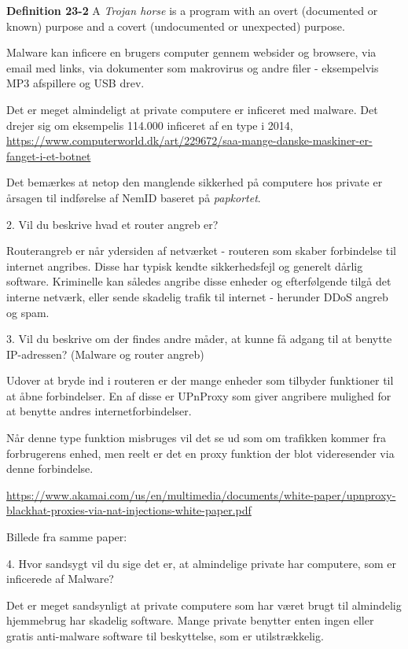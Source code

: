 \documentclass[a4paper,11pt,notitlepage]{report}
\begin{document}
{\bf Definition 23-2} A \emph{Trojan horse} is a program with an overt (documented or\\
known) purpose and a covert (undocumented or unexpected) purpose.

Malware kan inficere en brugers computer gennem websider og browsere, via email med links, via dokumenter som makrovirus og andre filer - eksempelvis MP3 afspillere og USB drev.

Det er meget almindeligt at private computere er inficeret med malware. Det drejer sig om eksempelis 114.000 inficeret af en type i 2014,\\ {\footnotesize\url{https://www.computerworld.dk/art/229672/saa-mange-danske-maskiner-er-fanget-i-et-botnet}}

Det bemærkes at netop den manglende sikkerhed på computere hos private er årsagen til indførelse af NemID baseret på \emph{papkortet}.

2.  Vil du beskrive hvad et router angreb er?

Routerangreb er når ydersiden af netværket - routeren som skaber forbindelse til internet angribes. Disse har typisk kendte sikkerhedsfejl og generelt dårlig software. Kriminelle kan således angribe disse enheder og efterfølgende tilgå det interne netværk, eller sende skadelig trafik til internet - herunder DDoS angreb og spam.


3.  Vil du beskrive om der findes andre måder, at kunne få adgang til at benytte IP-adressen? (Malware og router angreb)

Udover at bryde ind i routeren er der mange enheder som tilbyder funktioner til at åbne forbindelser. En af disse er UPnProxy som giver angribere mulighed for at benytte andres internetforbindelser.

Når denne type funktion misbruges vil det se ud som om trafikken kommer fra forbrugerens enhed, men reelt er det en proxy funktion der blot videresender via denne forbindelse.

{\footnotesize\url{https://www.akamai.com/us/en/multimedia/documents/white-paper/upnproxy-blackhat-proxies-via-nat-injections-white-paper.pdf}}

Billede fra samme paper:

4.  Hvor sandsygt vil du sige det er, at almindelige private har computere, som er inficerede af Malware?

Det er meget sandsynligt at private computere som har været brugt til almindelig hjemmebrug har skadelig software. Mange private benytter enten ingen eller gratis anti-malware software til beskyttelse, som er utilstrækkelig.
\end{document}
